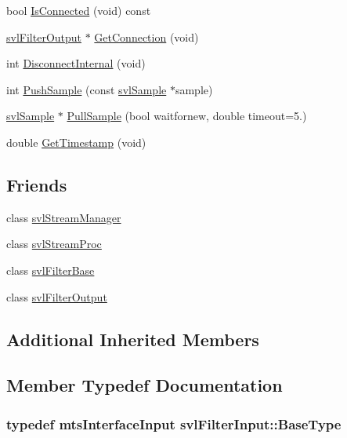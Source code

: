\begin{DoxyCompactItemize}
bool \hyperlink{classsvl_filter_input_a14b1c5c94c6291a8b7a055ece0ded07a}{Is\-Connected} (void) const 
\item 
\hyperlink{classsvl_filter_output}{svl\-Filter\-Output} $\ast$ \hyperlink{classsvl_filter_input_a03a6e05bc85fdcff26095b39c2ec1546}{Get\-Connection} (void)
\item 
int \hyperlink{classsvl_filter_input_a6cf9edb631f4393cbfb503d831ed1678}{Disconnect\-Internal} (void)
\item 
int \hyperlink{classsvl_filter_input_a78057fb405f74be6b9f561215bec60ea}{Push\-Sample} (const \hyperlink{classsvl_sample}{svl\-Sample} $\ast$sample)
\item 
\hyperlink{classsvl_sample}{svl\-Sample} $\ast$ \hyperlink{classsvl_filter_input_ac2aa6e4fce5f216d9d99d8a8e086c401}{Pull\-Sample} (bool waitfornew, double timeout=5.)
\item 
double \hyperlink{classsvl_filter_input_a91e7586b29b8dd2a484d0a8c50045506}{Get\-Timestamp} (void)
\end{DoxyCompactItemize}
\subsection*{Friends}
\begin{DoxyCompactItemize}
\item 
class \hyperlink{classsvl_filter_input_ab5eee58544f2ce644140e932afbe32db}{svl\-Stream\-Manager}
\item 
class \hyperlink{classsvl_filter_input_a6a9ee1dec5ca263793dca09411295245}{svl\-Stream\-Proc}
\item 
class \hyperlink{classsvl_filter_input_aadcba5e897486de2d761520b866f4ac0}{svl\-Filter\-Base}
\item 
class \hyperlink{classsvl_filter_input_a3f45c3511fc124d190c8ffb5953025f6}{svl\-Filter\-Output}
\end{DoxyCompactItemize}
\subsection*{Additional Inherited Members}


\subsection{Member Typedef Documentation}
\hypertarget{classsvl_filter_input_a1439c55646b38d500a6eaf9a761bf5a2}{
\subsubsection[{Base\-Type}]{\setlength{\rightskip}{0pt plus 5cm}typedef {\bf mts\-Interface\-Input} {\bf svl\-Filter\-Input\-::\-Base\-Type}}}\label{classsvl_filter_input_a1439c55646b38d500a6eaf9a761bf5a2}


